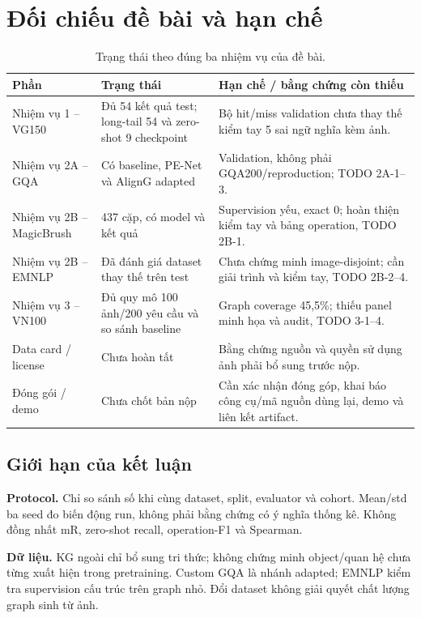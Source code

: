 \clearpage
\section{Đối chiếu đề bài và hạn chế}
\begin{table}[H]\centering\small
\caption{Trạng thái theo đúng ba nhiệm vụ của đề bài.}\label{tab:compliance}
\begin{tabularx}{\linewidth}{@{}p{35mm}p{43mm}X@{}}\toprule
Phần & Trạng thái & Hạn chế / bằng chứng còn thiếu\\\midrule
Nhiệm vụ 1 -- VG150 & Đủ 54 kết quả test; long-tail 54 và zero-shot 9 checkpoint & Bộ hit/miss validation chưa thay thế kiểm tay 5 sai ngữ nghĩa kèm ảnh.\\
Nhiệm vụ 2A -- GQA & Có baseline, PE-Net và AlignG adapted & Validation, không phải GQA200/reproduction; TODO 2A-1--3.\\
Nhiệm vụ 2B -- MagicBrush & 437 cặp, có model và kết quả & Supervision yếu, exact 0; hoàn thiện kiểm tay và bảng operation, TODO 2B-1.\\
Nhiệm vụ 2B -- EMNLP & Đã đánh giá dataset thay thế trên test & Chưa chứng minh image-disjoint; cần giải trình và kiểm tay, TODO 2B-2--4.\\
Nhiệm vụ 3 -- VN100 & Đủ quy mô 100 ảnh/200 yêu cầu và so sánh baseline & Graph coverage 45,5\%; thiếu panel minh họa và audit, TODO 3-1--4.\\
Data card / license & Chưa hoàn tất & Bằng chứng nguồn và quyền sử dụng ảnh phải bổ sung trước nộp.\\
Đóng gói / demo & Chưa chốt bản nộp & Cần xác nhận đóng góp, khai báo công cụ/mã nguồn dùng lại, demo và liên kết artifact.\\
\bottomrule\end{tabularx}\end{table}

\subsection{Giới hạn của kết luận}
\textbf{Protocol.} Chỉ so sánh số khi cùng dataset, split, evaluator và cohort.
Mean/std ba seed đo biến động run, không phải bằng chứng có ý nghĩa thống kê.
Không đồng nhất mR, zero-shot recall, operation-F1 và Spearman.

\textbf{Dữ liệu.} KG ngoài chỉ bổ sung tri thức; không chứng minh object/quan hệ
chưa từng xuất hiện trong pretraining. Custom GQA là nhánh adapted;
EMNLP kiểm tra supervision cấu trúc trên graph nhỏ. Đổi dataset không giải quyết
chất lượng graph sinh từ ảnh.

